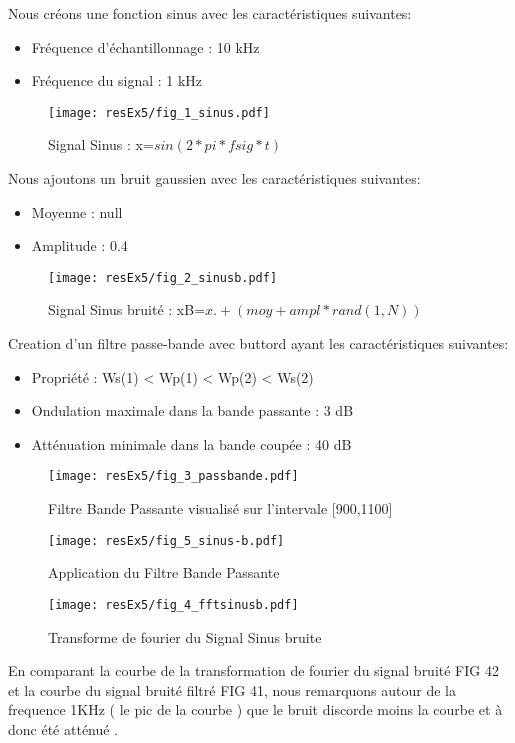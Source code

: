 Nous créons une fonction sinus avec les caractéristiques suivantes:\\
\begin{itemize}
\item Fréquence d'échantillonnage : 10 kHz
\item Fréquence du signal : 1 kHz 
\end{itemize}


\begin{figure}[H]
\centering
\texttt{[image: resEx5/fig\_1\_sinus.pdf]}
\caption{Signal Sinus : x=$sin(2*pi*fsig*t)$}
\end{figure}


Nous ajoutons un bruit gaussien avec les caractéristiques suivantes:\\
\begin{itemize}
\item Moyenne : null
\item Amplitude : 0.4
\end{itemize}

\begin{figure}[H]
\centering
\texttt{[image: resEx5/fig\_2\_sinusb.pdf]}
\caption{Signal Sinus bruité : xB=$ x .+ (moy + ampl*rand(1,N))$}
\end{figure}


Creation d'un filtre passe-bande avec buttord ayant les caractéristiques suivantes:\\
\begin{itemize}
\item Propriété : Ws(1) < Wp(1) < Wp(2) < Ws(2)
\item Ondulation maximale dans la bande passante : 3 dB
\item Atténuation minimale dans la bande coupée : 40 dB
\end{itemize}


\begin{figure}[H]
\centering
\texttt{[image: resEx5/fig\_3\_passbande.pdf]}
\caption{Filtre Bande Passante visualisé sur l'intervale [900,1100]}
\end{figure}


\begin{figure}[H]
\centering
\texttt{[image: resEx5/fig\_5\_sinus-b.pdf]}
\caption{Application du Filtre Bande Passante}
\end{figure}


\begin{figure}[H]
\centering
\texttt{[image: resEx5/fig\_4\_fftsinusb.pdf]}
\caption{Transforme de fourier du Signal Sinus bruite}
\end{figure}


En comparant la courbe de la transformation de fourier du signal bruité FIG 42 et la courbe du signal bruité filtré FIG 41, nous remarquons autour de la frequence 1KHz ( le pic de la courbe ) que le bruit discorde moins la courbe et à donc été atténué .


